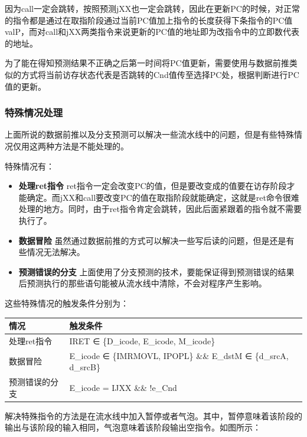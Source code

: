 因为call一定会跳转，按照预测jXX也一定会跳转，因此在更新PC的时候，对正常的指令都是通过在取指阶段通过当前PC值加上指令的长度获得下条指令的PC值valP，而对call和jXX两类指令来说更新的PC值的地址即为改指令中的立即数代表的地址。

为了能在得知预测结果不正确之后第一时间将PC值更新，需要使用与数据前推类似的方式将当前访存状态代表是否跳转的Cnd值传至选择PC处，根据判断进行PC值的更新。

\subsubsection{特殊情况处理}\label{ux7279ux6b8aux60c5ux51b5ux5904ux7406}

上面所说的数据前推以及分支预测可以解决一些流水线中的问题，但是有些特殊情况仅用这两种方法是不能处理的。

特殊情况有：

\begin{itemize}
\itemsep1pt\parskip0pt
\item
  \textbf{处理ret指令}
  ret指令一定会改变PC的值，但是要改变成的值要在访存阶段才能确定。而jXX和call要改变PC的值在取指阶段就能确定，这就是ret命令很难处理的地方。同时，由于ret指令肯定会跳转，因此后面紧跟着的指令就不需要执行了。
\item
  \textbf{数据冒险}
  虽然通过数据前推的方式可以解决一些写后读的问题，但是还是有些情况无法解决。
\item
  \textbf{预测错误的分支}
  上面使用了分支预测的技术，要能保证得到预测错误的结果后预测执行的那些语句能被从流水线中清除，不会对程序产生影响。
\end{itemize}

这些特殊情况的触发条件分别为：

\begin{longtable}[c]{@{}ll@{}}
\toprule
情况 & 触发条件\tabularnewline
\midrule
\endhead
处理ret指令 & IRET ∈ \{D\_icode, E\_icode, M\_icode\}\tabularnewline
数据冒险 & E\_icode ∈ \{IMRMOVL, IPOPL\} \&\& E\_dstM ∈ \{d\_srcA,
d\_srcB\}\tabularnewline
预测错误的分支 & E\_icode = IJXX \&\& !e\_Cnd\tabularnewline
\bottomrule
\end{longtable}

解决特殊指令的方法是在流水线中加入暂停或者气泡。其中，暂停意味着该阶段的输出与该阶段的输入相同，气泡意味着该阶段输出空指令。如图所示：

